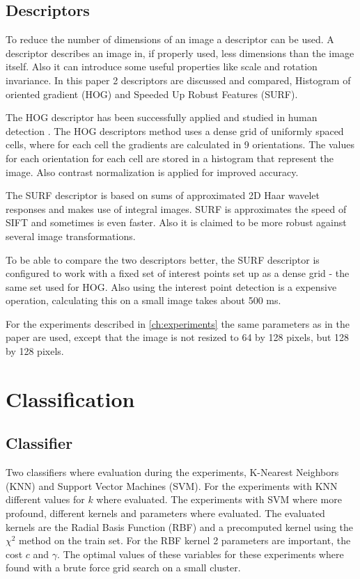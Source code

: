 \subsection*{Descriptors}
To reduce the number of dimensions of an image a descriptor can be used. A descriptor describes an image in, if properly used, less dimensions than the image itself. Also it can introduce some useful properties like scale and rotation invariance. In this paper 2 descriptors are discussed and compared, Histogram of oriented gradient\cite{NavneetDalal2006} (HOG) and Speeded Up Robust Features\cite{Bay2006} (SURF).

The HOG descriptor has been successfully applied and studied in human detection \cite{NavneetDalal2006, watanabe2009}. The HOG descriptors method uses a dense grid of uniformly spaced cells, where for each cell the gradients are calculated in 9 orientations. The values for each orientation for each cell are stored in a histogram that represent the image. Also contrast normalization is applied for improved accuracy.

The SURF descriptor is based on sums of approximated 2D Haar wavelet responses and makes use of integral images. SURF is approximates the speed of SIFT and sometimes is even faster\cite{Murillo2007, Valgren2010}. Also it is claimed to be more robust against several image transformations.

To be able to compare the two descriptors better, the SURF descriptor is configured to work with a fixed set of interest points set up as a dense grid - the same set used for HOG. Also using the interest point detection is a expensive operation, calculating this on a small image takes about 500 ms.

For the experiments described in \autoref{ch:experiments} the same parameters as in the \cite{watanabe2009} paper are used, except that the image is not resized to 64 by 128 pixels, but 128 by 128 pixels.



\section{Classification}

\subsection*{Classifier}
Two classifiers where evaluation during the experiments, K-Nearest Neighbors (KNN) and Support Vector Machines (SVM). For the experiments with KNN different values for $k$ where evaluated. The experiments with SVM where more profound, different kernels and parameters where evaluated. The evaluated kernels are the Radial Basis Function (RBF) and a precomputed kernel using the $\chi^2$ method on the train set. For the RBF kernel 2 parameters are important, the cost $c$ and $\gamma$. The optimal values of these variables for these experiments where found with a brute force grid search on a small cluster.

